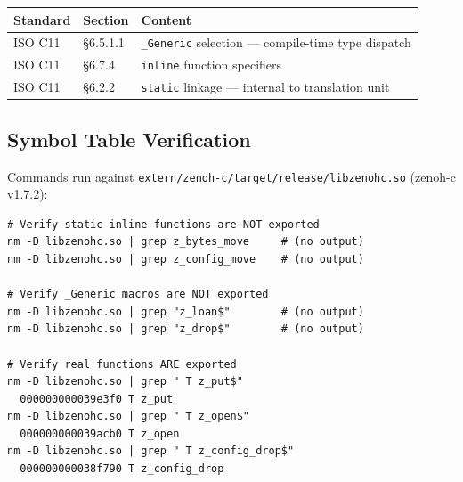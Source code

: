 \documentclass[11pt,a4paper]{article}
\newcommand{\code}[1]{\texttt{#1}}
\newcommand{\file}[1]{\texttt{#1}}
\begin{document}
\begin{table}[ht]
\centering\small
\begin{tabular}{lll}
  \toprule
  \textbf{Standard} & \textbf{Section} & \textbf{Content} \\
  \midrule
  ISO C11 & \S6.5.1.1 & \code{\_Generic} selection --- compile-time type dispatch \\
  ISO C11 & \S6.7.4   & \code{inline} function specifiers \\
  ISO C11 & \S6.2.2   & \code{static} linkage --- internal to translation unit \\
  \bottomrule
\end{tabular}
\end{table}

\subsection{Symbol Table Verification}

Commands run against \file{extern/zenoh-c/target/release/libzenohc.so}
(zenoh-c v1.7.2):

\begin{lstlisting}[style=shellstyle]
# Verify static inline functions are NOT exported
nm -D libzenohc.so | grep z_bytes_move     # (no output)
nm -D libzenohc.so | grep z_config_move    # (no output)

# Verify _Generic macros are NOT exported
nm -D libzenohc.so | grep "z_loan$"        # (no output)
nm -D libzenohc.so | grep "z_drop$"        # (no output)

# Verify real functions ARE exported
nm -D libzenohc.so | grep " T z_put$"
  000000000039e3f0 T z_put
nm -D libzenohc.so | grep " T z_open$"
  000000000039acb0 T z_open
nm -D libzenohc.so | grep " T z_config_drop$"
  000000000038f790 T z_config_drop
\end{lstlisting}
\end{document}
